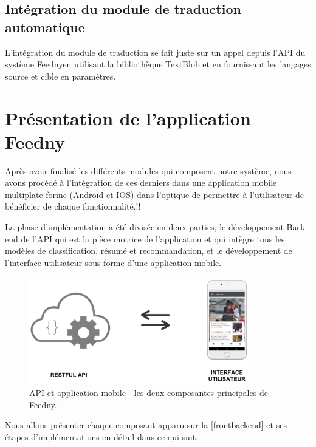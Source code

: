 \subsection{Intégration du module de traduction automatique}
L'intégration du module de traduction se fait juste sur un appel depuis l'API du système \textquotedbl Feedny\textquotedbl en utilisant la bibliothèque TextBlob et en fournissant les langages source et cible en paramètres.


\section{Présentation de l'application \textquotedbl Feedny\textquotedbl}
Après avoir finalisé les différents modules qui composent notre système, nous avons procédé à l'intégration de ces derniers dans une application mobile multiplate-forme (Androïd et IOS) dans l'optique de permettre à l'utilisateur de bénéficier de chaque fonctionnalité.!!

La phase d'implémentation a été divisée en deux parties, le développement Back-end de l'API qui est la pièce motrice de l'application et qui intègre tous les modèles de classification, résumé et recommandation, et le développement de l'interface utilisateur sous forme d'une application mobile.

\begin{figure}[H]
    \centering
    \includegraphics[height=132pt,width=270pt]{img/chapter4/frontbackend.png}
    \caption{API et application mobile - les deux composantes principales de \textquotedbl Feedny\textquotedbl. }
    \label{frontbackend}
\end{figure}

Nous allons présenter chaque composant apparu sur la \autoref{frontbackend} et ses étapes d'implémentations en détail dans ce qui suit.

